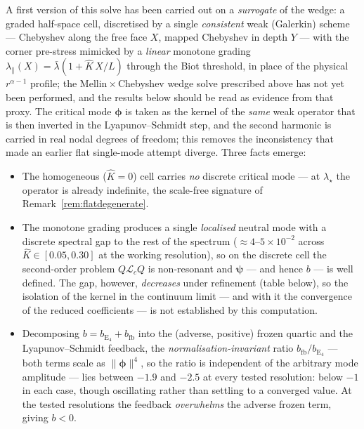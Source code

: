 A first version of this solve has been carried out on a \emph{surrogate} of the wedge: a graded half-space cell,
discretised by a single \emph{consistent} weak (Galerkin) scheme --- Chebyshev along the free face $X$, mapped
Chebyshev in depth $Y$ --- with the corner pre-stress mimicked by a \emph{linear} monotone grading
$\lambda_\parallel(X)=\bar\lambda(1+\hat K\,X/L)$ through the Biot threshold, in place of the physical
$r^{\alpha-1}$ profile; the Mellin\,$\times$\,Chebyshev wedge solve prescribed above has not yet been performed, and
the results below should be read as evidence from that proxy. The critical mode $\bm\phi$ is taken as the kernel of the
\emph{same} weak operator that is then inverted in the Lyapunov--Schmidt step, and the second harmonic is carried in
real nodal degrees of freedom; this removes the inconsistency that made an earlier flat single-mode attempt diverge.
Three facts emerge:
\begin{itemize}
  \item[\textup{(i)}] The homogeneous ($\hat K=0$) cell carries \emph{no} discrete critical mode --- at $\lambda_\star$
  the operator is already indefinite, the scale-free signature of Remark~\ref{rem:flatdegenerate}.
  \item[\textup{(ii)}] The monotone grading produces a single \emph{localised} neutral mode with a discrete spectral
  gap to the rest of the spectrum ($\approx 4$--$5\times10^{-2}$ across $\hat K\in[0.05,0.30]$ at the working
  resolution), so on the discrete cell the second-order problem $Q\mathcal L_cQ$ is non-resonant and $\bm\psi$ ---
  and hence $b$ --- is well defined. The gap, however, \emph{decreases} under refinement (table below), so the
  isolation of the kernel in the continuum limit --- and with it the convergence of the reduced coefficients --- is
  not established by this computation.
  \item[\textup{(iii)}] Decomposing $b=b_{\mathrm{E_4}}+b_{\mathrm{fb}}$ into the (adverse, positive) frozen quartic and
  the Lyapunov--Schmidt feedback, the \emph{normalisation-invariant} ratio $b_{\mathrm{fb}}/b_{\mathrm{E_4}}$ --- both
  terms scale as $\|\bm\phi\|^4$, so the ratio is independent of the arbitrary mode amplitude --- lies between
  $-1.9$ and $-2.5$ at every tested resolution: below $-1$ in each case, though oscillating rather than settling to
  a converged value. At the tested resolutions the feedback \emph{overwhelms} the adverse frozen term, giving $b<0$.
\end{itemize}
